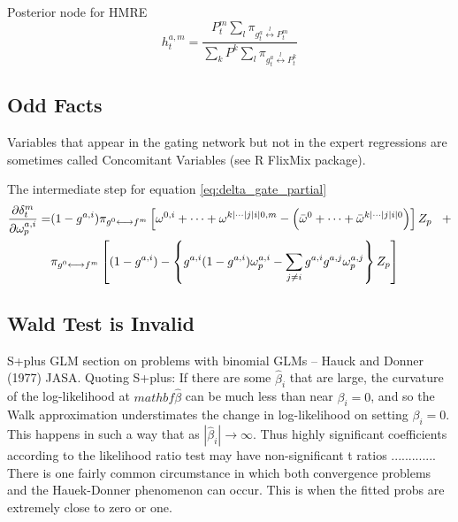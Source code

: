\documentclass[12pt]{article}
\newcommand{\mean}[1]{\bar{#1}}
\newcommand{\gateprod}[2]{\pi_{#1 \longleftrightarrow #2}}
\newcommand{\sumgateprod}[3]{\pi_{#1 \overset{#3}{\longleftrightarrow} #2}}
\newcommand{\shortsum}[1]{\sum \nolimits_{#1}}
\begin{document}
Posterior node for HMRE
\begin{equation} 
  h^{a,m}_{t} = \frac{P^{m}_{t} \shortsum{l} \sumgateprod{g^{a}_{t}}{P^{m}_{t}}{l}}{\sum_{k} P^{k} \shortsum{l} \sumgateprod{g^{a}_{t}}{P^{k}_{t}}{l}}
\end{equation}



\subsection{Odd Facts}

Variables that appear in the gating network but not in the expert regressions
are sometimes called Concomitant Variables (see R FlixMix package).

The intermediate step for equation \ref{eq:delta_gate_partial}
\begin{equation}
  \begin{split} \notag
    \frac{\partial \delta^{m}_{t}}{\partial \omega^{a,i}_{p}} =& (1 - g^{a,i})  \gateprod{g^{0}}{f^{m}}  \left[ \omega^{0, i} + \cdots + \omega^{k|\cdots|j|i|0, m} - \left( \mean{\omega}^{0} + \cdots + \mean{\omega}^{k|\cdots|j|i|0} \right) \right] Z_{p} \,\,\,\,\, + \\ 
    &\gateprod{g^{0}}{f^{m}} \left[ (1 - g^{a,i})  - \left\{ g^{a,i} (1 - g^{a,i}) \omega^{a,i}_{p} - \sum_{j \neq i} g^{a,i} g^{a,j} \omega^{a,j}_{p} \right\}  Z_{p}  \right]
  \end{split} 
\end{equation}


\subsection{Wald Test is Invalid}
S+plus GLM section on problems with binomial GLMs
  -- Hauck and Donner (1977) JASA. Quoting S+plus: If there are
  some $\hat{\beta}_{i}$ that are large, the curvature of the log-likelihood at
  $mathbf{\hat{\beta}}$ can be much less than near $\beta_{i}=0$, and so the Walk
  approximation understimates the change in log-likelihood on setting $\beta_{i}=0$.
  This happens in such a way that as $|\hat{\beta}_{i}| \rightarrow \infty$. Thus
  highly significant coefficients according to the likelihood ratio test may have
  non-significant t ratios ............. There is one fairly common circumstance
  in which both convergence problems and the Hauek-Donner phenomenon can occur.
  This is when the fitted probs are extremely close to zero or one.
\end{document}
